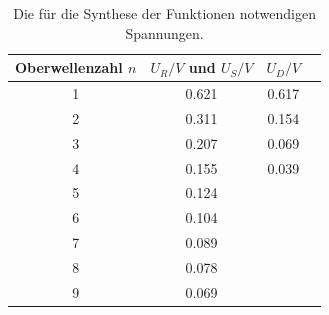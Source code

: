 \begin{table}[H]
  \centering
  \caption{Die für die Synthese der Funktionen notwendigen Spannungen.}
  \label{tab:Rechteckspannung}
  \begin{tabular}{c | c | c c}
    \toprule
    Oberwellenzahl $n$ & $U_R/V$ und $U_S/V$ & $U_D/V$   \\
    \midrule
    1 & 0.621 & 0.617\\
    2 & 0.311 & 0.154\\
    3 & 0.207 & 0.069\\
    4 & 0.155 & 0.039\\
    5 & 0.124\\
    6 & 0.104\\
    7 & 0.089\\
    8 & 0.078\\
    9 & 0.069\\
    \bottomrule
  \end{tabular}
\end{table}
